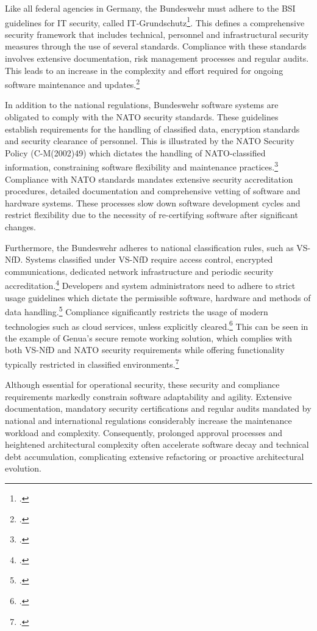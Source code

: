 Like all federal agencies in Germany, the Bundeswehr must adhere to the \ac{BSI} guidelines for IT security, called IT-Grundschutz\footcite[no page number]{BSIFAQ}. This defines a comprehensive security framework
that includes technical, personnel and infrastructural security measures through the use of several standards. Compliance with these standards involves extensive documentation, risk management processes and regular audits. 
This leads to an increase in the complexity and effort required for ongoing software maintenance and updates.\footcite[no page number]{BSIStandards}

In addition to the national regulations, Bundeswehr software systems are obligated to comply with the NATO security standards. These guidelines establish requirements for the handling of classified data, encryption standards and security clearance of personnel.
This is illustrated by the NATO Security Policy (C-M(2002)49) which dictates the handling of NATO-classified information, constraining software flexibility and maintenance practices.\footcite[Enclosure B, pp. 1–3; Enclosure F, pp. 1–2]{NATO2002SecurityPolicy} 
Compliance with NATO standards mandates extensive security accreditation procedures, detailed documentation and comprehensive vetting of software and hardware systems.
These processes slow down software development cycles and restrict flexibility due to the necessity of re-certifying software after significant changes.

Furthermore, the Bundeswehr adheres to national classification rules, such as \ac{VS-NfD}. Systems classified under \ac{VS-NfD} require access control, encrypted communications, dedicated network infrastructure and periodic security accreditation.\footcite[see Part 2, pp. 1–3; Part 3, pp. 1–6]{BMI2010VSNFD}
Developers and system administrators need to adhere to strict usage guidelines which dictate the permissible software, hardware and methods of data handling.\footcite[Part 3, No. 3.1–3.7, pp. 1–5]{BMI2010VSNFD} Compliance significantly restricts the usage of modern technologies such as cloud services, unless explicitly cleared.\footcite[Part 3, No. 3.4.1–3.4.5, pp. 4–5]{BMI2010VSNFD} 
This can be seen in the example of Genua’s secure remote working solution, which complies with both VS-NfD and NATO security requirements while offering functionality typically restricted in classified environments.\footcite[no page number]{Genua2023VSNFD}

Although essential for operational security, these security and compliance requirements markedly constrain software adaptability and agility. 
Extensive documentation, mandatory security certifications and regular audits mandated by national and international regulations considerably increase the maintenance workload and complexity. 
Consequently, prolonged approval processes and heightened architectural complexity often accelerate software decay and technical debt accumulation, complicating extensive refactoring or proactive architectural evolution.

